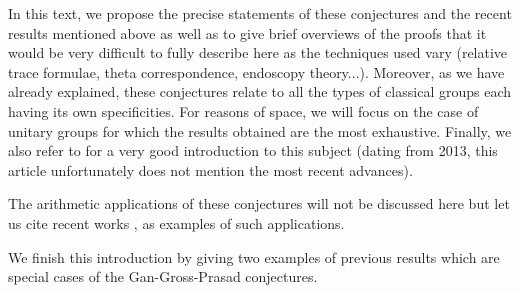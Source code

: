 In this text, we propose the precise statements of these conjectures and the recent results mentioned above as well as to give brief overviews of the proofs that it would be very difficult to fully describe here as the techniques used vary (relative trace formulae, theta correspondence, endoscopy theory...).
Moreover, as we have already explained, these conjectures relate to all the types of classical groups each having its own specificities. 
For reasons of space, we will focus on the case of unitary groups for which the results obtained are the most exhaustive.
Finally, we also refer to \cite{gan2014recent} for a very good introduction to this subject (dating from 2013, this article unfortunately does not mention the most recent advances).

The arithmetic applications of these conjectures will not be discussed here but let us cite recent works \cite{harris2001geometry}, \cite{prasanna2021automorphic} as examples of such applications.

We finish this introduction by giving two examples of previous results which are special cases of the Gan-Gross-Prasad conjectures.

